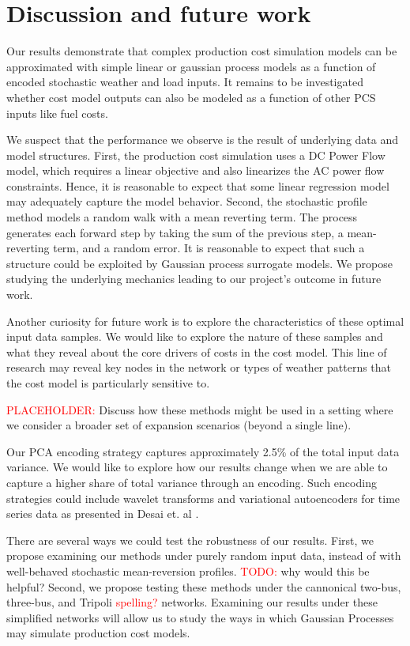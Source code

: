 \documentclass[10pt,twocolumn,letterpaper]{article}
\begin{document}
\section{Discussion and future work}
\label{sec:conclusion}

Our results demonstrate that complex production cost simulation models can be approximated with simple linear or gaussian process models as a function of encoded stochastic weather and load inputs. It remains to be investigated whether cost model outputs can also be modeled as a function of other PCS inputs like fuel costs.

We suspect that the performance we observe is the result of underlying data and model structures. First, the production cost simulation uses a DC Power Flow model, which requires a linear objective and also linearizes the AC power flow constraints. Hence, it is reasonable to expect that some linear regression model may adequately capture the model behavior. Second, the stochastic profile method models a random walk with a mean reverting term. The process generates each forward step by taking the sum of the previous step, a mean-reverting term, and a random error. It is reasonable to expect that such a structure could be exploited by Gaussian process surrogate models. We propose studying the underlying mechanics leading to our project's outcome in future work.

Another curiosity for future work is to explore the characteristics of these optimal input data samples. We would like to explore the nature of these samples and what they reveal about the core drivers of costs in the cost model. This line of research may reveal key nodes in the network or types of weather patterns that the cost model is particularly sensitive to.

\textcolor{red}{PLACEHOLDER:} Discuss how these methods might be used in a setting where we consider a broader set of expansion scenarios (beyond a single line).

Our PCA encoding strategy captures approximately 2.5\% of the total input data variance. We would like to explore how our results change when we are able to capture a higher share of total variance through an encoding. Such encoding strategies could include wavelet transforms and variational autoencoders for time series data as presented in Desai et. al \cite{desai2021timevae}.

There are several ways we could test the robustness of our results. First, we propose examining our methods under purely random input data, instead of with well-behaved stochastic mean-reversion profiles. \textcolor{red}{TODO:} why would this be helpful? Second, we propose testing these methods under the cannonical two-bus, three-bus, and Tripoli \textcolor{red}{spelling?} networks. Examining our results under these simplified networks will allow us to study the ways in which Gaussian Processes may simulate production cost models. 
\end{document}
